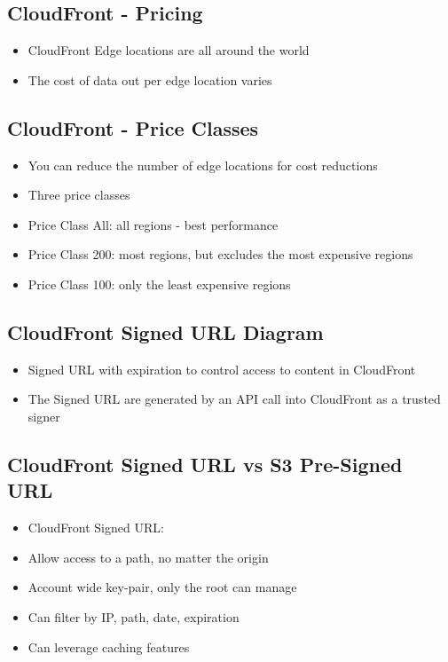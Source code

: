 \subsection{CloudFront - Pricing}
\begin{itemize}
    \item CloudFront Edge locations are all around the world
    \item The cost of data out per edge location varies
\end{itemize}

\subsection{CloudFront - Price Classes}
\begin{itemize}
    \item You can reduce the number of edge locations for cost reductions
    \item Three price classes
    \item Price Class All: all regions - best performance
    \item Price Class 200: most regions, but excludes the most expensive regions
    \item Price Class 100: only the least expensive regions
\end{itemize}


\subsection{CloudFront Signed URL Diagram}
\begin{itemize}
    \item Signed URL with expiration to control access to content in CloudFront
    \item The Signed URL are generated by an API call into CloudFront as a trusted signer
\end{itemize}

\subsection{CloudFront Signed URL vs S3 Pre-Signed URL}
\begin{itemize}
    \item CloudFront Signed URL:
    \item Allow access to a path, no matter the origin
    \item Account wide key-pair, only the root can manage
    \item Can filter by IP, path, date, expiration
    \item Can leverage caching features
\end{itemize}

